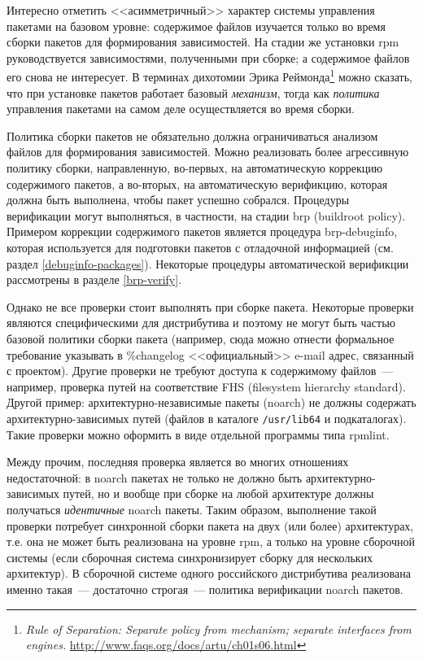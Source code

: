 \documentclass[russian,a4paper,12pt,titlepage]{article}
\begin{document}
Интересно отметить <<асимметричный>> характер системы управления пакетами на базовом уровне: содержимое
файлов изучается только во время сборки пакетов для формирования зависимостей.  На стадии же установки
rpm руководствуется зависимостями, полученными при сборке; а содержимое файлов его снова не интересует.
В терминах дихотомии Эрика Реймонда\footnote{\textit{Rule of Separation: Separate policy from mechanism;
separate interfaces from engines.} \url{http://www.faqs.org/docs/artu/ch01s06.html}}
можно сказать, что при установке пакетов работает базовый \textit{механизм}, тогда как \textit{политика}
управления пакетами на самом деле осуществляется во время сборки.

Политика сборки пакетов не обязательно должна ограничиваться анализом файлов для формирования зависимостей.
Можно реализовать более агрессивную политику сборки, направленную, во-первых, на автоматическую коррекцию содержимого
пакетов, а во-вторых, на автоматическую верификцию, которая должна быть выполнена, чтобы пакет успешно собрался.
Процедуры верификации могут выполняться, в частности, на стадии brp (buildroot policy).  Примером коррекции содержимого
пакетов является процедура brp-debuginfo, которая используется для подготовки пакетов с отладочной информацией (см. раздел
\ref{debuginfo-packages}).  Некоторые процедуры автоматической верификции рассмотрены в разделе \ref{brp-verify}.

Однако не все проверки стоит выполнять при сборке пакета.  Некоторые проверки
являются специфическими для дистрибутива и поэтому не могут быть частью базовой
политики сборки пакета (например, сюда можно отнести формальное требование указывать
в \%changelog <<официальный>> e-mail адрес, связанный с проектом).  Другие проверки не требуют
доступа к содержимому файлов~--- например, проверка путей на соответствие FHS (filesystem hierarchy standard).
Другой пример: архитектурно-независимые пакеты (noarch) не должны содержать архитектурно-зависимых путей
(файлов в каталоге \verb|/usr/lib64| и подкаталогах).  Такие проверки можно оформить в виде отдельной программы
типа rpmlint.

Между прочим, последняя проверка является во многих отношениях недостаточной: в noarch пакетах не только не должно быть
архитектурно-зависимых путей, но и вообще при сборке на любой архитектуре должны получаться \emph{идентичные} noarch пакеты.
Таким образом, выполнение такой проверки потребует синхронной сборки пакета на двух (или более) архитектурах, т.е.
она не может быть реализована на уровне rpm, а только на уровне сборочной системы (если сборочная система синхронизирует
сборку для нескольких архитектур).  В сборочной системе одного российского дистрибутива реализована именно такая~--- достаточно
строгая~--- политика верификации noarch пакетов.
\end{document}

